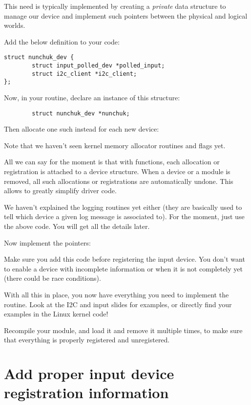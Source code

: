 This need is typically implemented by creating a {\em private} data
structure to manage our device and implement such pointers between
the physical and logical worlds.

Add the below definition to your code:

\begin{verbatim}
struct nunchuk_dev {
        struct input_polled_dev *polled_input;
        struct i2c_client *i2c_client;
};
\end{verbatim}

Now, in your  routine, declare an instance of
this structure:

\begin{verbatim}
        struct nunchuk_dev *nunchuk;
\end{verbatim}

Then allocate one such instead for each new device:


Note that we haven't seen kernel memory allocator routines and flags
yet.

All we can say for the moment is that with  functions,
each allocation or registration
is attached to a device structure. When a device or a module is removed,
all such allocations or registrations are automatically undone. This
allows to greatly simplify driver code.

We haven't explained the  logging routines yet either
(they are basically used to tell which device a given log message is
associated to).  For the moment, just use the above code. You will get
all the details later.

Now implement the pointers:


Make sure you add this code before registering the input device. You
don't want to enable a device with incomplete information or when it is
not completely yet (there could be race conditions).

With all this in place, you now have everything you need to implement
the  routine. Look at the I2C and input slides for
examples, or directly find your examples in the Linux kernel code!

Recompile your module, and load it and remove it multiple times, to
make sure that everything is properly registered and unregistered.

\section{Add proper input device registration information}

